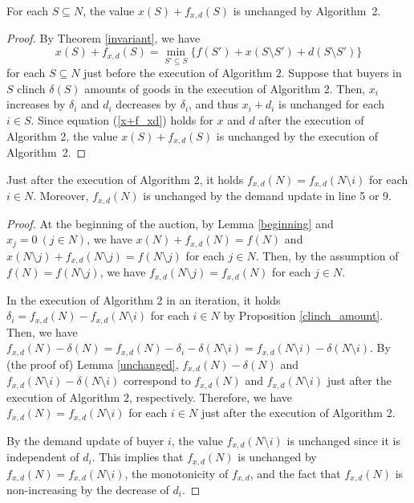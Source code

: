 \documentclass[letterpaper,11pt]{article}
\begin{document}
\begin{lemma}
\label{unchanged}
For each $S\subseteq N$, the value
$x(S)+f_{x,d}(S)$ is unchanged by Algorithm~2.
\end{lemma}
\begin{proof}
By Theorem \ref{invariant}, we have 
\begin{equation}
\label{x+f_xd}
x(S)+f_{x,d}(S)=\min_{S'\subseteq S}\{f(S')+x(S\setminus S')+d(S\setminus S')\}
\end{equation}
for each $S\subseteq N$ just before the execution of Algorithm 2. 
Suppose that buyers in $S$ clinch $\delta(S)$ amounts of goods 
in the execution of Algorithm 2.
Then, $x_i$ increases by $\delta_i$ and $d_i$ decreases by $\delta_i$, 
and thus $x_i+d_i$ is unchanged for each $i\in S$.
Since equation (\ref{x+f_xd}) holds for $x$ and $d$ after the execution of Algorithm 2,
the value $x(S)+f_{x,d}(S)$ is unchanged by the execution of Algorithm~2. 
\end{proof}

	\begin{lemma}
	\label{equation_of_all_goods}
	Just after the execution of Algorithm 2, 
	it holds $f_{x,d}(N)=f_{x,d}(N\setminus i)$ for each $i\in N$.
	Moreover, $f_{x,d}(N)$ is unchanged by the demand update in line 5 or 9.
	\end{lemma}
	\begin{proof}
	At the beginning of the auction, by Lemma \ref{beginning} and $x_j=0\ (j\in N)$, we have 
	$x(N)+f_{x,d}(N)=f(N)$ and $x(N\setminus j)+f_{x,d}(N\setminus j)=f(N\setminus j)$ for each $j\in N$.
	Then, by the assumption of $f(N)=f(N\setminus j)$, we have 
	$f_{x,d}(N\setminus j)=f_{x,d}(N)$ for each $j\in N$.

	In the execution of Algorithm 2 in an iteration, 
	it holds $\delta_i=f_{x,d}(N)-f_{x,d}(N\setminus i)$ for each $i\in N$ by Proposition \ref{clinch_amount}.
	Then, we have 
	$f_{x,d}(N)-\delta(N)=f_{x,d}(N)-\delta_i-
	\delta(N\setminus i)=f_{x,d}(N\setminus i)-\delta(N\setminus i)$.
	By (the proof of) Lemma \ref{unchanged}, 
	$f_{x,d}(N)-\delta(N)$ and $f_{x,d}(N\setminus i)-\delta(N\setminus i)$ 
	correspond to $f_{x,d}(N)$ and $f_{x,d}(N\setminus i)$
	just after the execution of Algorithm 2, respectively. 
	Therefore, we have $f_{x,d}(N)=f_{x,d}(N\setminus i)$ for each $i\in N$  
	just after the execution of Algorithm 2.
	
	By the demand update of buyer $i$, the value $f_{x,d}(N\setminus i)$ is unchanged 
	since it is independent of $d_i$. 
	This implies that $f_{x,d}(N)$ is unchanged 
	by $f_{x,d}(N)=f_{x,d}(N\setminus i)$, 
	the monotonicity of $f_{x,d}$, and the fact that $f_{x,d}(N)$ is non-increasing by the decrease of $d_i$.
	\end{proof}
\end{document}
